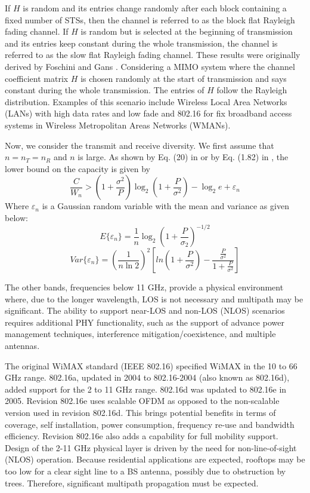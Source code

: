 If $H$ is random and its entries change randomly after each block
containing a fixed number of STSs, then the channel is referred to
as the block flat Rayleigh fading channel. If $H$ is random but is
selected at the beginning of transmission and its entries keep
constant during the whole transmission, the channel is referred to
as the slow flat Rayleigh fading channel. These results were
originally derived by Foschini and Gans \cite{9}. Considering a MIMO
system where the channel coefficient matrix $H$ is chosen randomly
at the start of transmission and says constant during the whole
transmission. The entries of $H$ follow the Rayleigh distribution.
Examples of this scenario include Wireless Local Area Networks
(LANs) with high data rates and low fade and 802.16 for fix
broadband access systems in Wireless Metropolitan Areas Networks
(WMANs).

Now, we consider the transmit and receive diversity. We first assume
that $n=n_{T}=n_{R}$ and $n$ is large. As shown by Eq. (20) in
\cite{9} or by Eq. (1.82) in \cite{13}, the lower bound on the
capacity is given by
\begin{equation}
\frac{C}{W_{n}}>(1+\frac{\sigma^{2}}{P})\log_{2}(1+\frac{P}{\sigma^{2}})-\log_{2}e+\varepsilon_{n}
\end{equation}
Where $\varepsilon_{n}$ is a Gaussian random variable with the mean
and variance as given below:
\[E\{\varepsilon_{n}\}=\frac{1}{n}\log_{2}(1+\frac{P}{\sigma_{2}})^{-1/2}\]
\[Var\{\varepsilon_{n}\}=(\frac{1}{n\ln2})^{2}[ln(1+\frac{P}{\sigma^{2}})-\frac{\frac{P}{\sigma^{2}}}{1+\frac{P}{\sigma^{2}}}] \]

The other bands, frequencies below 11 GHz, provide a physical
environment where, due to the longer wavelength, LOS is not
necessary and multipath may be significant. The ability to support
near-LOS and non-LOS (NLOS) scenarios requires additional PHY
functionality, such as the support of advance power management
techniques, interference mitigation/coexistence, and multiple
antennas.

The original WiMAX standard (IEEE 802.16) specified WiMAX in the 10
to 66 GHz range. 802.16a, updated in 2004 to 802.16-2004 (also known
as 802.16d), added support for the 2 to 11 GHz range. 802.16d was
updated to 802.16e in 2005. Revision 802.16e uses scalable OFDM as
opposed to the non-scalable version used in revision 802.16d. This
brings potential benefits in terms of coverage, self installation,
power consumption, frequency re-use and bandwidth efficiency.
Revision 802.16e also adds a capability for full mobility support.
Design of the 2-11 GHz physical layer is driven by the need for
non-line-of-sight (NLOS) operation. Because residential applications
are expected, rooftops may be too low for a clear sight line to a BS
antenna, possibly due to obstruction by trees. Therefore,
significant multipath propagation must be expected.

